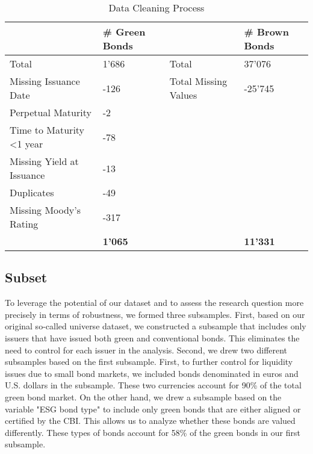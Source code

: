 \begin{table}[h!]
\caption{Data Cleaning Process}
\label{cleaning}
\begin{adjustbox}{center}
\begin{tabular}{llll}
\hline
 \hline
 & \textbf{\# Green Bonds} & & \textbf{\# Brown Bonds} \\ \hline
Total & 1'686 & Total & 37'076 \\ 
Missing Issuance Date & -126 & Total Missing Values & -25'745 \\ 
Perpetual Maturity & -2 \\ 
Time to Maturity \textless 1 year & -78 \\ 
Missing Yield at Issuance & -13 \\ 
Duplicates & -49 \\ 
Missing Moody's Rating & -317 \\ \hline
& \bfseries{1'065} & & \bfseries{11'331} \\ \cline{2-2} \cline{4-4}
\end{tabular}
\end{adjustbox}
\end{table}
\subsection{Subset}

To leverage the potential of our dataset and to assess the research question more precisely in terms of robustness, we formed three subsamples. First, based on our original so-called universe dataset, we constructed a subsample that includes only issuers that have issued both green and conventional bonds. This eliminates the need to control for each issuer in the analysis. Second, we drew two different subsamples based on the first subsample. First, to further control for liquidity issues due to small bond markets, we included bonds denominated in euros and U.S. dollars in the subsample. These two currencies account for 90\% of the total green bond market. On the other hand, we drew a subsample based on the variable "ESG bond type" to include only green bonds that are either aligned or certified by the CBI. This allows us to analyze whether these bonds are valued differently. These types of bonds account for 58\% of the green bonds in our first subsample.

\newpage


